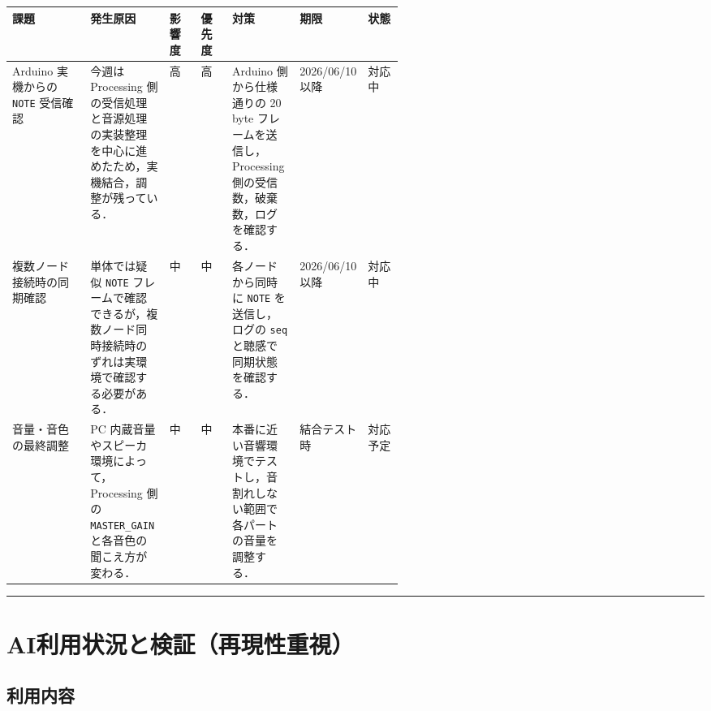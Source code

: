 \documentclass[uplatex,dvipdfmx,a4paper,11pt]{jsarticle}
\newcommand{\sectionrule}{\par\medskip\noindent\rule{\linewidth}{0.6pt}\par\medskip}
\begin{document}
\begin{tabularx}{\linewidth}{@{}p{0.20\linewidth}Xp{0.08\linewidth}p{0.08\linewidth}Xp{0.11\linewidth}p{0.09\linewidth}@{}}
\toprule
課題 & 発生原因 & 影響度 & 優先度 & 対策 & 期限 & 状態 \\
\midrule
Arduino 実機からの \texttt{NOTE} 受信確認 & 今週は Processing 側の受信処理と音源処理の実装整理を中心に進めたため，実機結合，調整が残っている． & 高 & 高 & Arduino 側から仕様通りの 20 byte フレームを送信し，Processing 側の受信数，破棄数，ログを確認する． & 2026/06/10以降 & 対応中 \\
複数ノード接続時の同期確認 & 単体では疑似 \texttt{NOTE} フレームで確認できるが，複数ノード同時接続時のずれは実環境で確認する必要がある． & 中 & 中 & 各ノードから同時に \texttt{NOTE} を送信し，ログの \texttt{seq} と聴感で同期状態を確認する． & 2026/06/10以降 & 対応中 \\
音量・音色の最終調整 & PC 内蔵音量やスピーカ環境によって，Processing 側の \texttt{MASTER\_GAIN} と各音色の聞こえ方が変わる． & 中 & 中 & 本番に近い音響環境でテストし，音割れしない範囲で各パートの音量を調整する． & 結合テスト時 & 対応予定 \\
\bottomrule
\end{tabularx}

\sectionrule

\section{AI利用状況と検証（再現性重視）}

\subsection{利用内容}
\end{document}
